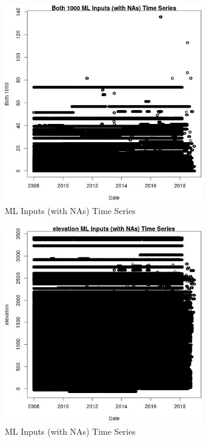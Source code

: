 \begin{figure} 
\centering  
\includegraphics[width=0.77\textwidth]{Code_Outputs/Report_ML_input_PM25_Step4_part_e_de_duplicated_aves_compiled_2019-05-21wNAs_Both_1000vDate.jpg} 
\caption{\label{fig:Report_ML_input_PM25_Step4_part_e_de_duplicated_aves_compiled_2019-05-21wNAsBoth_1000vDate}ML Inputs (with NAs) Time Series} 
\end{figure} 
 

\begin{figure} 
\centering  
\includegraphics[width=0.77\textwidth]{Code_Outputs/Report_ML_input_PM25_Step4_part_e_de_duplicated_aves_compiled_2019-05-21wNAs_elevationvDate.jpg} 
\caption{\label{fig:Report_ML_input_PM25_Step4_part_e_de_duplicated_aves_compiled_2019-05-21wNAselevationvDate}ML Inputs (with NAs) Time Series} 
\end{figure} 
 

